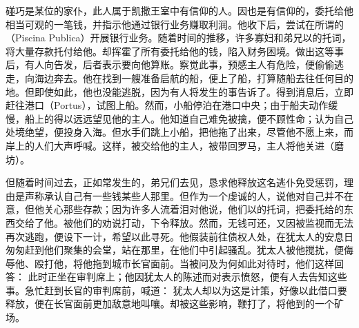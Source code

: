 碰巧是某位的家仆，此人属于凯撒王室中有信仰的人。因也是有信仰的，委托给他相当可观的一笔钱，并指示他通过银行业务赚取利润。他收下后，尝试在所谓的（Piscina Publica）开展银行业务。随着时间的推移，许多寡妇和弟兄以的托词，将大量存款托付给他。却挥霍了所有委托给他的钱，陷入财务困境。做出这等事后，有人向告发，后者表示要向他算账。察觉此事，预感主人有危险，便偷偷逃走，向海边奔去。他在找到一艘准备启航的船，便上了船，打算随船去往任何目的地。但即使如此，他也没能逃脱，因为有人将发生的事告诉了。得到消息后，立即赶往港口（Portus），试图上船。然而，小船停泊在港口中央；由于船夫动作缓慢，船上的得以远远望见他的主人。他知道自己难免被擒，便不顾性命；认为自己处境绝望，便投身入海。但水手们跳上小船，把他拖了出来，尽管他不愿上来，而岸上的人们大声呼喊。这样，被交给他的主人，被带回罗马，主人将他关进（磨坊）。\par

但随着时间过去，正如常发生的，弟兄们去见，恳求他释放这名逃仆免受惩罚，理由是声称承认自己有一些钱某些人那里。但作为一个虔诚的人，说他对自己并不在意，但他关心那些存款；因为许多人流着泪对他说，他们以的托词，把委托给的东西交给了他。被他们的劝说打动，下令释放。然而，无钱可还，又因被监视而无法再次逃跑，便设下一计，希望以此寻死。他假装前往债权人处，在犹太人的安息日匆匆赶到他们聚集的会堂，站在那里，在他们中引起骚乱。犹太人被他搅扰，便侮辱他、殴打他，将他拖到城市长官面前。当被问及为何如此对待时，他们这样回答： 此时正坐在审判席上；他因犹太人的陈述而对表示愤怒，便有人去告知这些事。急忙赶到长官的审判席前，喊道： 犹太人却以为这是计策，好像以此借口要释放，便在长官面前更加敌意地叫嚷。却被这些影响，鞭打了，将他到的一个矿场。\par

